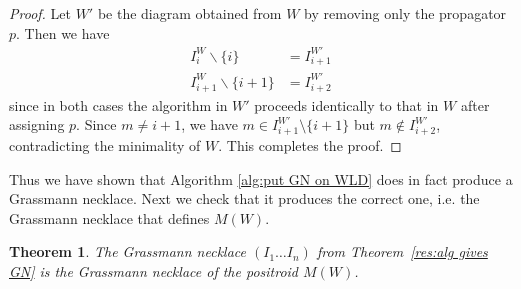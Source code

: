 \documentclass[11pt]{article}
\newtheorem{thm}{Theorem}[section]
\theoremstyle{remark}
\theoremstyle{definition}
\begin{document}
\begin{proof}
Let $W'$ be the diagram obtained from $W$ by removing only the propagator $p$.  Then we have
\begin{align*}
  I_i^{W} \backslash \{i\} & = I_{i+1}^{W'} \\
  I_{i+1}^{W} \backslash \{i+1\} & = I_{i+2}^{W'}
\end{align*}
since in both cases the algorithm in $W'$ proceeds identically to that in $W$ after assigning $p$. Since $m \neq i+1$, we have $m\in I_{i+1}^{W'}\setminus\{i+1\}$ but $m\not\in I_{i+2}^{W'}$, contradicting the minimality of $W$. This completes the proof.
\end{proof}

Thus we have shown that Algorithm \ref{alg:put GN on WLD} does in fact produce a Grassmann necklace. Next we check that it produces the correct one, i.e. the Grassmann necklace that defines $M(W)$. 
\begin{thm}\label{res alg gives correct GN}
The Grassmann necklace $(I_1 \ldots I_n)$ from Theorem~\ref{res:alg gives GN} is the Grassmann necklace of the positroid $M(W)$.
\end{thm}
\end{document}
